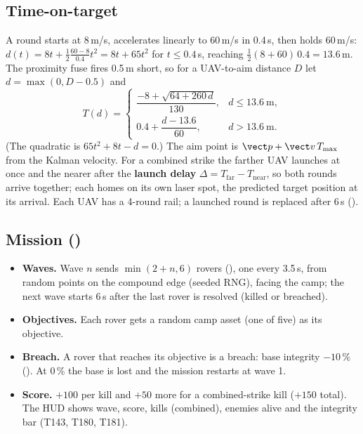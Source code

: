 \subsection{Time-on-target}
A round starts at 8\,m/s, accelerates linearly to 60\,m/s in 0.4\,s, then holds 60\,m/s: $d(t)=8t+\tfrac12\tfrac{60-8}{0.4}t^2=8t+65t^2$ for $t\le0.4$\,s, reaching $\tfrac12(8+60)\,0.4=13.6$\,m. The
proximity fuse fires 0.5\,m short, so for a UAV-to-aim distance $D$ let $d=\max(0,D-0.5)$ and
\begin{equation}
T(d)=\begin{cases}\dfrac{-8+\sqrt{64+260\,d}}{130}, & d\le13.6\ \text{m},\\[2mm] 0.4+\dfrac{d-13.6}{60}, & d>13.6\ \text{m}.\end{cases}
\end{equation}
(The quadratic is $65t^2+8t-d=0$.) The aim point is $\vect p+\vect v\,T_\text{max}$ from the Kalman velocity. For a combined strike the farther UAV launches
at once and the nearer after the \textbf{launch delay} $\Delta=T_\text{far}-T_\text{near}$, so both rounds arrive together; each homes on its own laser spot, the predicted target position at its arrival. Each UAV has a 4-round rail; a launched round is replaced after 6\,s ().

\begin{figure}[h]
\centering
{}
\caption{}
\end{figure}
\subsection{Mission ()}
\begin{itemize}
  \item \textbf{Waves.} Wave $n$ sends $\min(2+n,6)$ rovers (), one every 3.5\,s, from random points on the compound edge (seeded RNG), facing the camp; the next wave starts 6\,s after the last rover is resolved (killed or breached).
  \item \textbf{Objectives.} Each rover gets a random camp asset (one of five) as its objective.
  \item \textbf{Breach.} A rover that reaches its objective is a breach: base integrity $-10\,\%$ (). At 0\,\% the base is lost and the mission restarts at wave 1.
  \item \textbf{Score.} $+100$ per kill and $+50$ more for a combined-strike kill ($+150$ total). The HUD shows wave, score, kills (combined), enemies alive and the integrity bar (T143, T180, T181).
\end{itemize}

